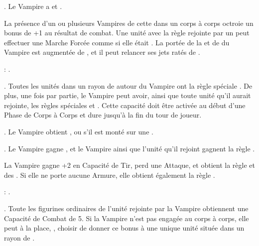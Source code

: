 { \textbf{\bloodlinepower}. Le Vampire a \thunderouscharge{} et .

\endpricelist

\separator


\noindent\parbox{\columnwidth}{
La présence d'un ou plusieurs Vampires de cette \bloodline{} dans un corps à corps octroie un bonus de +1 au résultat de combat. Une unité avec la règle \undead{} rejointe par un \vonkarnstein{} peut effectuer une Marche Forcée comme si elle était \vampiric{}. La portée de la \inspiringpresence{} et de \holdyourground{} du Vampire est augmentée de , et il peut relancer ses jets ratés de \vampiric{}. 

\bloodties{}: \darkcoach{}.
}

\startpricelist

 \textbf{\ancientbloodpower}. Toutes les unités dans un rayon de  autour du Vampire ont la règle spéciale \hardtarget{}. De plus, une fois par partie, le Vampire peut avoir, ainsi que toute unité qu'il aurait rejointe, les règles spéciales \lightningattacks{} et . Cette capacité doit être activée au début d'une Phase de Corps à Corps et dure jusqu'à la fin du tour de joueur.

 \textbf{\bloodlinepower}. Le Vampire obtient , ou  s'il est monté sur une \largetarget{}.

 \textbf{\bloodlinepower}. Le Vampire gagne \awaken{\zombies, \direwolves, \batswarms, \greatbats}, et le Vampire ainsi que l'unité qu'il rejoint gagnent la règle \swiftstride{}.

\endpricelist


\noindent\parbox{\columnwidth}{
La Vampire gagne +2 en Capacité de Tir, perd une Attaque, et obtient la règle \lightningreflexes{} et des \throwingweapons{}. Si elle ne porte aucune Armure, elle obtient également la règle \distracting{}.

\bloodties{}: \courtofthedamned{}.
}

\startpricelist

 \textbf{\ancientbloodpower}. Toute les figurines ordinaires de l'unité rejointe par la Vampire obtiennent une Capacité de Combat de 5. Si la Vampire n'est pas engagée au corps à corps, elle peut à la place, , choisir de donner ce bonus à une unique unité située dans un rayon de .

}
